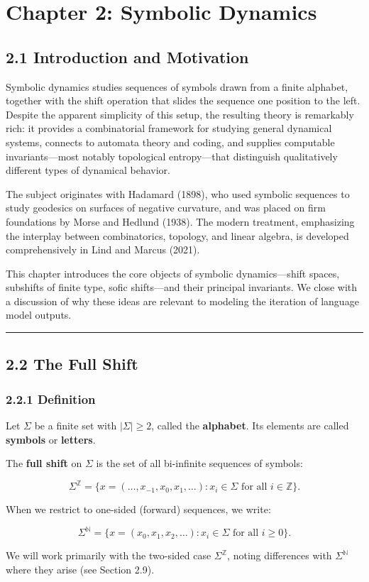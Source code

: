 \chapter{Chapter 2: Symbolic Dynamics}

\section{2.1 Introduction and Motivation}

Symbolic dynamics studies sequences of symbols drawn from a finite alphabet, together with the shift operation that slides the sequence one position to the left. Despite the apparent simplicity of this setup, the resulting theory is remarkably rich: it provides a combinatorial framework for studying general dynamical systems, connects to automata theory and coding, and supplies computable invariants---most notably topological entropy---that distinguish qualitatively different types of dynamical behavior.

The subject originates with Hadamard (1898), who used symbolic sequences to study geodesics on surfaces of negative curvature, and was placed on firm foundations by Morse and Hedlund (1938). The modern treatment, emphasizing the interplay between combinatorics, topology, and linear algebra, is developed comprehensively in Lind and Marcus (2021).

This chapter introduces the core objects of symbolic dynamics---shift spaces, subshifts of finite type, sofic shifts---and their principal invariants. We close with a discussion of why these ideas are relevant to modeling the iteration of language model outputs.

\bigskip\hrule\bigskip

\section{2.2 The Full Shift}

\subsection{2.2.1 Definition}

Let $\Sigma$ be a finite set with $|\Sigma| \geq 2$, called the \textbf{alphabet}. Its elements are called \textbf{symbols} or \textbf{letters}.

\begin{definition}
The \textbf{full shift} on $\Sigma$ is the set of all bi-infinite sequences of symbols:

\[
\Sigma^{\mathbb{Z}} = \{ x = (\ldots, x_{-1}, x_0, x_1, \ldots) : x_i \in \Sigma \text{ for all } i \in \mathbb{Z} \} .
\]

When we restrict to one-sided (forward) sequences, we write:

\[
\Sigma^{\mathbb{N}} = \{ x = (x_0, x_1, x_2, \ldots) : x_i \in \Sigma \text{ for all } i \geq 0 \} .
\]

We will work primarily with the two-sided case $\Sigma^{\mathbb{Z}}$, noting differences with $\Sigma^{\mathbb{N}}$ where they arise (see Section 2.9).
\end{definition}

